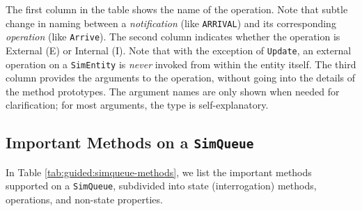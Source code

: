 \documentclass[12pt]{book}
\begin{document}
The first column in the table shows the name of the operation.
Note that subtle change in naming between
  a {\em notification\/} (like \lstinline|ARRIVAL|)
  and its corresponding {\em operation\/} (like \lstinline|Arrive|).
The second column indicates whether the operation
  is External (E) or Internal (I).
Note that with the exception of \lstinline|Update|,
  an external operation on a \lstinline|SimEntity|
  is {\em never\/} invoked from within the entity itself.
The third column provides the arguments to the operation,
  without going into the details of the method prototypes.
The argument names are only shown when needed for clarification;
  for most arguments, the type is self-explanatory.

\subsection{Important Methods on a \texttt{SimQueue}}

In Table \ref{tab:guided:simqueue-methods},
  we list the important methods supported on a \lstinline|SimQueue|,
  subdivided into state (interrogation) methods,
  operations,
  and non-state properties.
\end{document}
